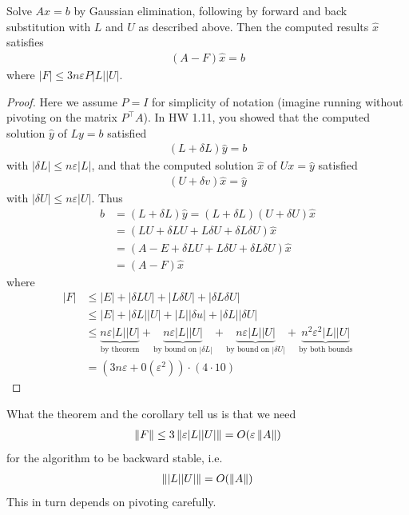 \documentclass[11pt]{article}
\numberwithin{equation}{section}
\begin{document}
\begin{corollary}
    Solve $Ax=b$ by Gaussian elimination, following by forward and back substitution with $L$ and $U$ as described above.
    Then the computed results $\hat{x}$ satisfies \begin{align*}
        (A-F)\hat{x} = b 
    \end{align*}
    where $|F| \leq 3 n \varepsilon P|L||U|$.
    \begin{proof}
        Here we assume $P=I$ for simplicity of notation (imagine running without pivoting on the matrix $P^\top A$). 
        In HW 1.11, you showed that the computed solution $\hat{y}$ of $Ly=b$ satisfied \begin{align*}
            (L+\delta L) \hat{y}=b
        \end{align*}
        with $|\delta L| \leq n \varepsilon |L|$, and that the computed solution $\hat{x}$ of $Ux=\hat{y}$ satisfied \begin{align*}
            (U+\delta v) \hat{x}=\hat{y}
        \end{align*}
        with $|\delta U| \leq n \varepsilon |U|$. Thus \begin{align*}
            b &=(L+\delta L) \hat{y}=(L+\delta L)(U+\delta U) \hat{x} \\
            &= (L U+\delta L U+L \delta U+ \delta L \delta U) \hat{x} \\
            &= (A-E+\delta L U+L \delta U+ \delta L \delta U) \hat{x} \\
            &= (A-F) \hat{x}
        \end{align*}
        where \begin{align*}
            |F| &\leq |E| +|\delta L U|+|L \delta U|+|\delta L \delta U| \\
            &\leq |E|+|\delta L| |U|+|L| |\delta u|+|\delta L || \delta U| \\
            &\leq \underbrace{n \varepsilon |L||U|}_{\text{by theorem}} + \underbrace{n \varepsilon |L||U|}_{\text{by bound on }|\delta L|} + \underbrace{n \varepsilon |L||U|}_{\text{by bound on }|\delta U|} + \underbrace{n^2 \varepsilon^2 |L||U|}_{\text{by both bounds}} \\
            &= \left(3 n \varepsilon+0\left(\varepsilon^{2}\right)\right) \cdot(4 \cdot 10)
        \end{align*}
    \end{proof}
\end{corollary}

What the theorem and the corollary tell us is that we need \begin{align*}
    \left\| F \right\| \leq 3 \left\| \varepsilon  |L||U| \right\| = O(\varepsilon \left\| A \right\|)
\end{align*}
for the algorithm to be backward stable, i.e. \begin{align*}
    \left\| |L||U| \right\| = O( \left\| A \right\|)
\end{align*}
This in turn depends on pivoting carefully.
\end{document}
